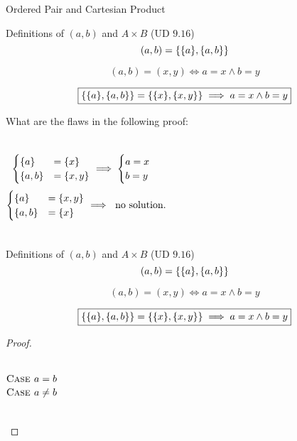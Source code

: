 \begin{frame}{}
  \centerline{\LARGE Ordered Pair and Cartesian Product}

  \vspace{0.60cm}
\end{frame}

\begin{frame}{}
  \begin{exampleblock}{Definitions of $(a,b)$ and $A \times B$ (UD $9.16$)}
    \[
      (a, b) = \{\{a\}, \{a,b\}\}
    \]

    \[
      (a,b) = (x,y) \iff a = x \land b = y
    \]
  \end{exampleblock}

  \pause
  \[
    \boxed{\{\{a\}, \{a,b\}\} = \{\{x\}, \{x,y\}\} \implies a = x \land b = y}
  \]

  \pause
  \vspace{0.50cm}
  What are the flaws in the following proof:
  \begin{columns}
      \begin{equation*}
	\begin{cases}
	  \{a\} &= \{x\} \\
	  \{a,b\} &= \{x,y\}
	\end{cases}
	\implies \begin{cases}
	    a = x \\
	    b = y
	  \end{cases}
      \end{equation*}
      \[
	\begin{cases}
	  \{a\} &= \{x,y\} \\
	  \{a,b\} &= \{x\}
	\end{cases}
	\implies \text{ no solution.}
      \]
  \end{columns}
\end{frame}

\begin{frame}{}
  \begin{exampleblock}{Definitions of $(a,b)$ and $A \times B$ (UD $9.16$)}
    \[
      (a, b) = \{\{a\}, \{a,b\}\}
    \]

    \[
      (a,b) = (x,y) \iff a = x \land b = y
    \]
  \end{exampleblock}

  \[
    \boxed{\{\{a\}, \{a,b\}\} = \{\{x\}, \{x,y\}\} \implies a = x \land b = y}
  \]

  \vspace{0.50cm}
  \begin{proof}
    \begin{columns}
        \[
	  \textsc{Case } a = b
	\]
        \[
	  \textsc{Case } a \neq b
	\]
    \end{columns}
  \end{proof}
\end{frame}

